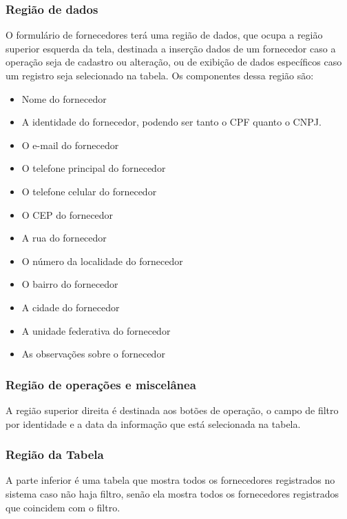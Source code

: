 \documentclass[
	article,			%
	12pt,				%
	oneside,			%
	a4paper,			%
	english,			%
	brazil,				%
	sumario=tradicional
	]{abntex2}
\begin{document}
			\subsubsection{Região de dados}
			O formulário de fornecedores terá uma região de dados, que ocupa a região superior esquerda da tela, destinada a inserção dados de um fornecedor caso a operação seja de cadastro ou alteração, ou de exibição de dados específicos caso um registro seja selecionado na tabela.
			Os componentes dessa região são:
			\begin{itemize}\itemsep1.5pt
				\item Nome do fornecedor
				\item A identidade do fornecedor, podendo ser tanto o CPF quanto o CNPJ.
				\item O e-mail do fornecedor
				\item O telefone principal do fornecedor
				\item O telefone celular do fornecedor
				\item O CEP do fornecedor
				\item A rua do fornecedor
				\item O número da localidade do fornecedor
				\item O bairro do fornecedor
				\item A cidade do fornecedor
				\item A unidade federativa do fornecedor
				\item As observações sobre o fornecedor
			\end{itemize}	
			\subsubsection{Região de operações e miscelânea}
			A região superior direita é destinada aos botões de operação, o campo de filtro por identidade e a data da informação que está selecionada na tabela.
			\subsubsection{Região da Tabela}
			A parte inferior é uma tabela que mostra todos os fornecedores registrados no sistema caso não haja filtro, senão ela mostra todos os fornecedores registrados que coincidem com o filtro.
	\newpage
\end{document}
